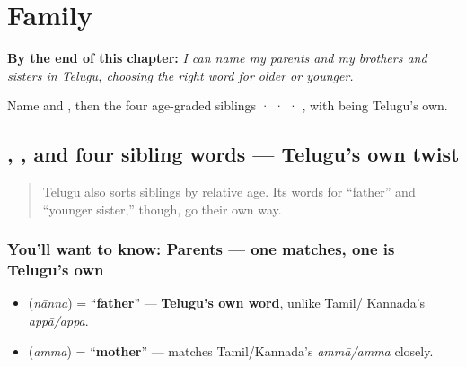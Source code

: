 
\chapter{Family}
\label{ch:te-family}

\begin{chapteropening}
\textbf{By the end of this chapter:} \emph{I can name my parents and my brothers and sisters in Telugu, choosing the right word for older or younger.}

Name  and , then the four age-graded siblings  ·  ·  · , with  being Telugu's own.
\end{chapteropening}

\section[\texorpdfstring{\te{నాన్న} \te{అమ్మ} \te{అన్న} … (nānna amma anna …)}{నాన్న అమ్మ అన్న … (nānna amma anna …)}]{, , and four sibling words — Telugu's own twist}

\label{lesson:TE-C12-kutumbam}



\begin{quote}
Telugu also sorts siblings by relative age. Its words for \textquotedblleft{}father\textquotedblright{} and \textquotedblleft{}younger sister,\textquotedblright{} though, go their own way.
\end{quote}

\subsection*{You'll want to know: Parents — one matches, one is Telugu's own}
\begin{itemize}
\raggedright
  \item \textbf{} (\emph{nānna}) = \textquotedblleft{}\textbf{father}\textquotedblright{} — \textbf{Telugu's own word}, unlike Tamil/ Kannada's \emph{appā/appa}.
  \item \textbf{} (\emph{amma}) = \textquotedblleft{}\textbf{mother}\textquotedblright{} — matches Tamil/Kannada's \emph{ammā/amma} closely.
\end{itemize}

